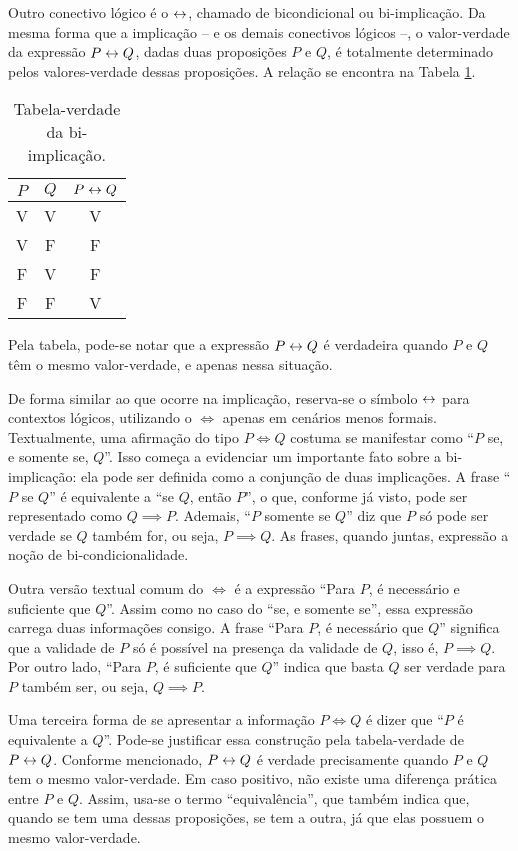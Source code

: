 Outro conectivo lógico é o $\leftrightarrow$, chamado de bicondicional ou bi-implicação.
Da mesma forma que a implicação -- e os demais conectivos lógicos --, o valor-verdade da expressão $P \leftrightarrow Q$, dadas duas proposições $P$ e $Q$, é totalmente determinado pelos valores-verdade dessas proposições.
A relação se encontra na Tabela \ref{tbl:bi-implicacao}.

\begin{table}[h]
\caption{Tabela-verdade da bi-implicação.}
\label{tbl:bi-implicacao}
\centering
\begin{tabular}{ccc}
$P$		& $Q$		& $P \leftrightarrow Q$	\\ \hline
V		& V			& V			\\
V		& F			& F			\\
F		& V			& F			\\
F		& F			& V			\\	
\end{tabular}
\end{table}
%
\noindent Pela tabela, pode-se notar que a expressão $P \leftrightarrow Q$ é verdadeira quando $P$ e $Q$ têm o mesmo valor-verdade, e apenas nessa situação.

De forma similar ao que ocorre na implicação, reserva-se o símbolo $\leftrightarrow$ para contextos lógicos, utilizando o $\iff$ apenas em cenários menos formais.
Textualmente, uma afirmação do tipo $P \iff Q$ costuma se manifestar como ``$P$ se, e somente se, $Q$''. 
Isso começa a evidenciar um importante fato sobre a bi-implicação: ela pode ser definida como a conjunção de duas implicações.
A frase ``$P$ se $Q$'' é equivalente a ``se $Q$, então $P$'', o que, conforme já visto, pode ser representado como $Q \implies P$.
Ademais, ``$P$ somente se $Q$'' diz que $P$ só pode ser verdade se $Q$ também for, ou seja, $P \implies Q$. 
As frases, quando juntas, expressão a noção de bi-condicionalidade.

Outra versão textual comum do $\iff$ é a expressão ``Para $P$, é necessário e suficiente que $Q$''.
Assim como no caso do ``se, e somente se'', essa expressão carrega duas informações consigo.
A frase ``Para $P$, é necessário que $Q$'' significa que a validade de $P$ só é possível na presença da validade de $Q$, isso é, $P \implies Q$.
Por outro lado, ``Para $P$, é suficiente que $Q$'' indica que basta $Q$ ser verdade para $P$ também ser, ou seja, $Q \implies P$.

Uma terceira forma de se apresentar a informação $P \iff Q$ é dizer que ``$P$ é equivalente a $Q$''.
Pode-se justificar essa construção pela tabela-verdade de $P \leftrightarrow Q$. 
Conforme mencionado, $P \leftrightarrow Q$ é verdade precisamente quando $P$ e $Q$ tem o mesmo valor-verdade.
Em caso positivo, não existe uma diferença prática entre $P$ e $Q$.
Assim, usa-se o termo ``equivalência'', que também indica que, quando se tem uma dessas proposições, se tem a outra, já que elas possuem o mesmo valor-verdade.

